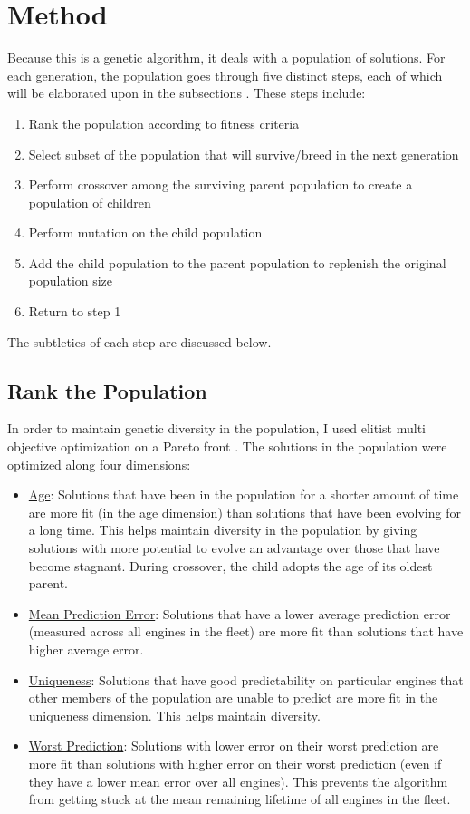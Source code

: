 \documentclass{acm_proc_article-sp}
\begin{document}
\section{Method}
Because this is a genetic algorithm, it deals with a population of solutions. For each generation, the population goes through five distinct steps, each of which will be elaborated upon in the subsections \cite{class}. These steps include:

\begin{enumerate}
\item Rank the population according to fitness criteria
\item Select subset of the population that will survive/breed in the next generation
\item Perform crossover among the surviving parent population to create a population of children
\item Perform mutation on the child population
\item Add the child population to the parent population to replenish the original population size
\item Return to step 1
\end{enumerate}

The subtleties of each step are discussed below.

\subsection{Rank the Population}
In order to maintain genetic diversity in the population, I used elitist multi objective optimization on a Pareto front \cite{class}. The solutions in the population were optimized along four dimensions:

\begin{itemize}
\item {\underline{Age}}: Solutions that have been in the population for a shorter amount of time are more fit (in the age dimension) than solutions that have been evolving for a long time. This helps maintain diversity in the population by giving solutions with more potential to evolve an advantage over those that have become stagnant. During crossover, the child adopts the age of its oldest parent. \cite{class}
\item {\underline{Mean Prediction Error}}: Solutions that have a lower average prediction error (measured across all engines in the fleet) are more fit than solutions that have higher average error.
\item {\underline{Uniqueness}}: Solutions that have good predictability on particular engines that other members of the population are unable to predict are more fit in the uniqueness dimension. This helps maintain diversity.
\item {\underline{Worst Prediction}}: Solutions with lower error on their worst prediction are more fit than solutions with higher error on their worst prediction (even if they have a lower mean error over all engines). This prevents the algorithm from getting stuck at the mean remaining lifetime of all engines in the fleet.
\end{itemize}
\end{document}
